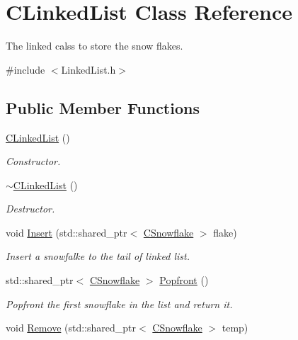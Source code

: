 \hypertarget{class_c_linked_list}{\section{C\+Linked\+List Class Reference}
\label{class_c_linked_list}
}


The linked calss to store the snow flakes.  




{\ttfamily \#include $<$Linked\+List.\+h$>$}

\subsection*{Public Member Functions}
\begin{DoxyCompactItemize}
\item 
\hypertarget{class_c_linked_list_a1acc364e288b1fd8deef87405d55eb8b}{\hyperlink{class_c_linked_list_a1acc364e288b1fd8deef87405d55eb8b}{C\+Linked\+List} ()}\label{class_c_linked_list_a1acc364e288b1fd8deef87405d55eb8b}

\begin{DoxyCompactList}\small\item\em Constructor. \end{DoxyCompactList}\item 
\hypertarget{class_c_linked_list_a485e9d04a818f41bc49b8190c7eab5ab}{\hyperlink{class_c_linked_list_a485e9d04a818f41bc49b8190c7eab5ab}{$\sim$\+C\+Linked\+List} ()}\label{class_c_linked_list_a485e9d04a818f41bc49b8190c7eab5ab}

\begin{DoxyCompactList}\small\item\em Destructor. \end{DoxyCompactList}\item 
void \hyperlink{class_c_linked_list_a99ab91eab972887ff91d11cc23550391}{Insert} (std\+::shared\+\_\+ptr$<$ \hyperlink{class_c_snowflake}{C\+Snowflake} $>$ flake)
\begin{DoxyCompactList}\small\item\em Insert a snowfalke to the tail of linked list. \end{DoxyCompactList}\item 
std\+::shared\+\_\+ptr$<$ \hyperlink{class_c_snowflake}{C\+Snowflake} $>$ \hyperlink{class_c_linked_list_af26de4eaa8a0c7df65be6a458e6224c9}{Popfront} ()
\begin{DoxyCompactList}\small\item\em Popfront the first snowflake in the list and return it. \end{DoxyCompactList}\item 
\hypertarget{class_c_linked_list_a715d68d55b85aa65f7ca0ad2e1970776}{void \hyperlink{class_c_linked_list_a715d68d55b85aa65f7ca0ad2e1970776}{Remove} (std\+::shared\+\_\+ptr$<$ \hyperlink{class_c_snowflake}{C\+Snowflake} $>$ temp)}\label{class_c_linked_list_a715d68d55b85aa65f7ca0ad2e1970776}


\end{DoxyCompactItemize}
